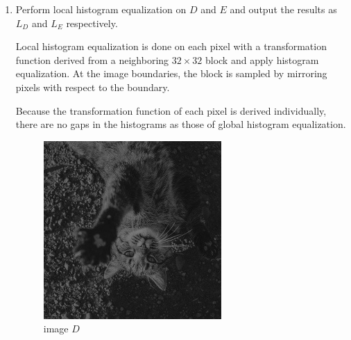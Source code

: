 \documentclass[12pt,a4paper,notitlepage,oneside,amsmath,amssymb]{article}
\begin{document}
\begin{CJK*}{UTF8}{bkai}
\begin{enumerate}[label=(\alph*)]
          \newpage
    \item Perform local histogram equalization on \(D\) and \(E\) and output the results as \(L_D\) and \(L_E\) respectively.

          Local histogram equalization is done on each pixel with a transformation function derived from a neighboring \(32 \times 32\) block and apply histogram equalization. At the image boundaries, the block is sampled by mirroring pixels with respect to the boundary.

          Because the transformation function of each pixel is derived individually, there are no gaps in the histograms as those of global histogram equalization.

          \begin{figure}[hbt!]
            \centering
            \begin{minipage}{.25\textwidth}
              \centering
              \includegraphics[width=.95\linewidth]{imageD}
              \caption*{image \(D\)}
            \end{minipage}%
            \begin{minipage}{.25\textwidth}
              \centering

\end{minipage}
\end{figure}
\end{enumerate}
\end{CJK*}
\end{document}
